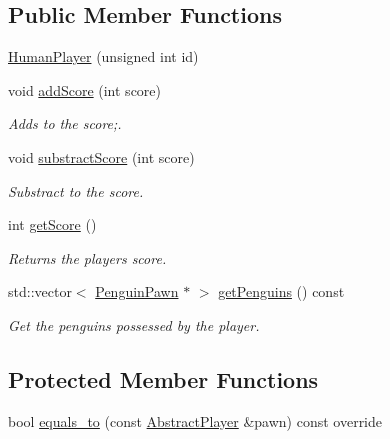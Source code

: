 \subsection*{Public Member Functions}
\begin{DoxyCompactItemize}
\item 
\hyperlink{classgame_1_1penguin_1_1_human_player_a4f91e8095a6c97c1a099d1576910267e}{Human\+Player} (unsigned int id)
\item 
void \hyperlink{classgame_1_1penguin_1_1_human_player_a1474720bb1f767c195ac316dd6a8ee82}{add\+Score} (int score)
\begin{DoxyCompactList}\small\item\em Adds to the score;. \end{DoxyCompactList}\item 
void \hyperlink{classgame_1_1penguin_1_1_human_player_ac164fc99bfe3fc2c6818aeb7d41fc885}{substract\+Score} (int score)
\begin{DoxyCompactList}\small\item\em Substract to the score. \end{DoxyCompactList}\item 
int \hyperlink{classgame_1_1penguin_1_1_human_player_afe805f2359ba2c909c078a7fc3833ede}{get\+Score} ()
\begin{DoxyCompactList}\small\item\em Returns the player\textquotesingle{}s score. \end{DoxyCompactList}\item 
std\+::vector$<$ \hyperlink{classgame_1_1penguin_1_1_penguin_pawn}{Penguin\+Pawn} $\ast$ $>$ \hyperlink{classgame_1_1penguin_1_1_human_player_a28c5485b12e0c8fcd340458255c06587}{get\+Penguins} () const
\begin{DoxyCompactList}\small\item\em Get the penguins possessed by the player. \end{DoxyCompactList}\end{DoxyCompactItemize}
\subsection*{Protected Member Functions}
\begin{DoxyCompactItemize}
\item 
bool \hyperlink{classgame_1_1penguin_1_1_human_player_ad0f5548eee1fb7b866c592da4b529b69}{equals\+\_\+to} (const \hyperlink{classgame_1_1_abstract_player}{Abstract\+Player} \&pawn) const override
\end{DoxyCompactItemize}
